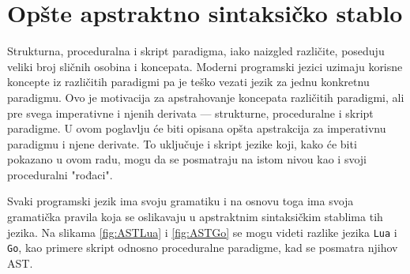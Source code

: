 \section{Opšte apstraktno sintaksičko stablo}
\label{sec:MyAST}

Strukturna, proceduralna i skript paradigma, iako naizgled različite, poseduju veliki broj sličnih osobina i koncepata. Moderni programski jezici uzimaju korisne koncepte iz različitih paradigmi pa je teško vezati jezik za jednu konkretnu paradigmu. Ovo je motivacija za apstrahovanje koncepata različitih paradigmi, ali pre svega imperativne i njenih derivata --- strukturne, proceduralne i skript paradigme. U ovom poglavlju će biti opisana opšta apstrakcija za imperativnu paradigmu i njene derivate. To uključuje i skript jezike koji, kako će biti pokazano u ovom radu, mogu da se posmatraju na istom nivou kao i svoji proceduralni "rođaci".

Svaki programski jezik ima svoju gramatiku i na osnovu toga ima svoja gramatička pravila koja se oslikavaju u apstraktnim sintaksičkim stablima tih jezika. Na slikama \ref{fig:ASTLua} i \ref{fig:ASTGo} se mogu videti razlike jezika \texttt{Lua} i \texttt{Go}, kao primere skript odnosno proceduralne paradigme, kad se posmatra njihov AST.

